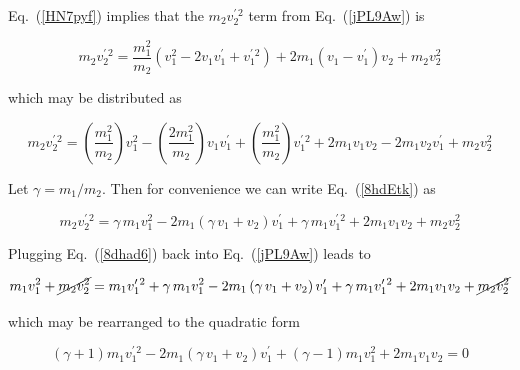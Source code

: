 \documentclass{article}
\numberwithin{equation}{section}
\numberwithin{figure}{section}
\begin{document}
Eq.~(\ref{HN7pyf}) implies that the $m_2 v_2^{\prime\,2}$ term from Eq.~(\ref{jPL9Aw}) is

\begin{equation*}
    m_2 v_2^{\prime\,2} = \frac{m_1^2}{m_2} \left(v_1^2 - 2v_1 v_1^{\prime} + v_1^{\prime\,2}\right) +
    2m_1 \left(v_1 - v_1^{\prime}\right) v_2 + m_2 v_2^2
\end{equation*}

which may be distributed as

\begin{equation} \label{8hdEtk}
    m_2 v_2^{\prime\,2} = \left(\frac{m_1^2}{m_2}\right) v_1^2 - \left(\frac{2m_1^2}{m_2}\right) v_1 v_1^{\prime} + \left(\frac{m_1^2}{m_2}\right) v_1^{\prime\,2} + 2m_1 v_1 v_2 - 2 m_1 v_2 v_1^{\prime} + m_2 v_2^2
\end{equation}

Let $\gamma = m_1/m_2$. Then for convenience we can write Eq.~(\ref{8hdEtk}) as

\begin{equation} \label{8dhad6}
    m_2 v_2^{\prime\,2} = \gamma\, m_1 v_1^2 - 2 m_1 \left(\gamma\, v_1 + v_2\right)v_1^{\prime} + \gamma\, m_1 v_1^{\prime\,2} + 2m_1 v_1 v_2 + m_2 v_2^2
\end{equation}

Plugging Eq.~(\ref{8dhad6}) back into Eq.~(\ref{jPL9Aw}) leads to 

\begin{equation*}
    m_1 v_1^2 + \cancel{m_2 v_2^2} = m_1 v_1^{\prime\,2} + \gamma\, m_1 v_1^2 - 2 m_1 \left(\gamma\, v_1 + v_2\right)v_1^{\prime} + \gamma\, m_1 v_1^{\prime\,2} + 2m_1 v_1 v_2 + \cancel{m_2 v_2^2}
\end{equation*}

which may be rearranged to the quadratic form



\begin{equation} \label{xkxn0Z}
    (\gamma + 1) m_1 v_1^{\prime\,2}  - 2 m_1 \left(\gamma\, v_1 + v_2\right) v_1^{\prime} + \left(\gamma - 1\right) m_1 v_1^2 + 2 m_1 v_1 v_2 = 0
\end{equation}
\end{document}
